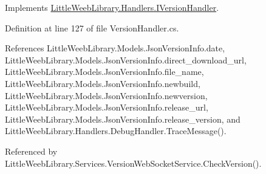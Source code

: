 Implements \mbox{\hyperlink{interface_little_weeb_library_1_1_handlers_1_1_i_version_handler_a812c819dce905da83c29a48e3aabba2e}{Little\+Weeb\+Library.\+Handlers.\+I\+Version\+Handler}}.



Definition at line 127 of file Version\+Handler.\+cs.



References Little\+Weeb\+Library.\+Models.\+Json\+Version\+Info.\+date, Little\+Weeb\+Library.\+Models.\+Json\+Version\+Info.\+direct\+\_\+download\+\_\+url, Little\+Weeb\+Library.\+Models.\+Json\+Version\+Info.\+file\+\_\+name, Little\+Weeb\+Library.\+Models.\+Json\+Version\+Info.\+newbuild, Little\+Weeb\+Library.\+Models.\+Json\+Version\+Info.\+newversion, Little\+Weeb\+Library.\+Models.\+Json\+Version\+Info.\+release\+\_\+url, Little\+Weeb\+Library.\+Models.\+Json\+Version\+Info.\+release\+\_\+version, and Little\+Weeb\+Library.\+Handlers.\+Debug\+Handler.\+Trace\+Message().



Referenced by Little\+Weeb\+Library.\+Services.\+Version\+Web\+Socket\+Service.\+Check\+Version().


